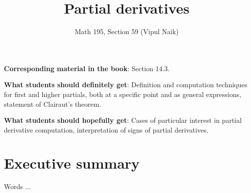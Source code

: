 \documentclass[10pt]{amsart}
\title{Partial derivatives}
\author{Math 195, Section 59 (Vipul Naik)}
\begin{document}
\maketitle

{\bf Corresponding material in the book}: Section 14.3.

{\bf What students should definitely get}: Definition and computation
techniques for first and higher partials, both at a specific point and
as general expressions, statement of Clairaut's theorem.

{\bf What students should hopefully get}: Cases of particular interest
in partial derivative computation, interpretation of signs of partial
derivatives.

\section*{Executive summary}

Words ...
\end{document}
